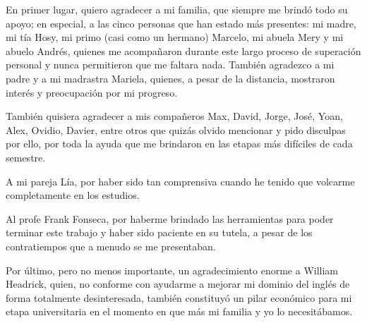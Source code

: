 \begin{acknowledgements}
    En primer lugar, quiero agradecer a mi familia, que siempre me brindó todo su apoyo; en especial, a las cinco personas que han estado más presentes: mi madre, mi tía Hosy, mi primo (casi como un hermano) Marcelo, mi abuela Mery y mi abuelo Andrés, quienes me acompañaron durante este largo proceso de superación personal y nunca permitieron que me faltara nada. También agradezco a mi padre y a mi madrastra Mariela, quienes, a pesar de la distancia, mostraron interés y preocupación por mi progreso.

    También quisiera agradecer a mis compañeros Max, David, Jorge, José, Yoan, Alex, Ovidio, Davier, entre otros que quizás olvido mencionar y pido disculpas por ello, por toda la ayuda que me brindaron en las etapas más difíciles de cada semestre.

    A mi pareja Lía, por haber sido tan comprensiva cuando he tenido que volcarme completamente en los estudios.

    Al profe Frank Fonseca, por haberme brindado las herramientas para poder terminar este trabajo y haber sido paciente en su tutela, a pesar de los contratiempos que a menudo se me presentaban.

    Por último, pero no menos importante, un agradecimiento enorme a William \\ Headrick, quien, no conforme con ayudarme a mejorar mi dominio del inglés de forma totalmente desinteresada, también constituyó un pilar económico para mi etapa universitaria en el momento en que más mi familia y yo lo necesitábamos.
\end{acknowledgements}
